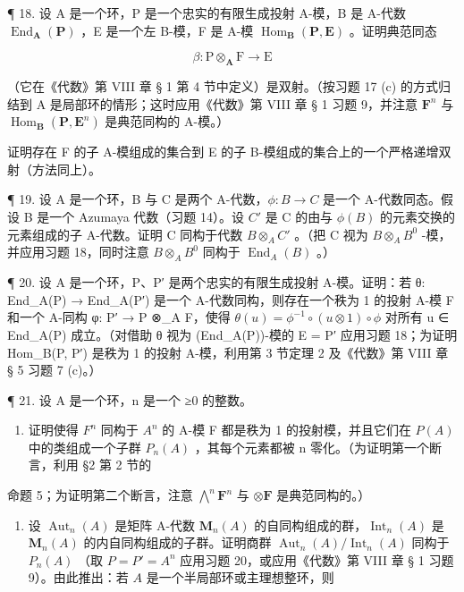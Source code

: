 ¶ 18. 设 A 是一个环，P 是一个忠实的有限生成投射 A-模，B 是 A-代数 \(\operatorname{End}_{\mathbf{A}}(\mathbf{P})\) ，E 是一个左 B-模，F 是 A-模 \(\operatorname{Hom}_{\mathbf{B}}(\mathbf{P}, \mathbf{E})\) 。证明典范同态

\[
\beta \colon \mathrm{P} \otimes_ {\mathbf {A}} \mathrm{F} \rightarrow \mathrm{E}
\]

（它在《代数》第 VIII 章 § 1 第 4 节中定义）是双射。（按习题 17 (c) 的方式归结到 A 是局部环的情形；这时应用《代数》第 VIII 章 § 1 习题 9，并注意 \(\mathbf{F}^n\) 与 \(\operatorname{Hom}_{\mathbf{B}}(\mathbf{P}, \mathbf{E}^n)\) 是典范同构的 A-模。）

证明存在 F 的子 A-模组成的集合到 E 的子 B-模组成的集合上的一个严格递增双射（方法同上）。

¶ 19. 设 A 是一个环，B 与 C 是两个 A-代数，\(\phi: B \to C\) 是一个 A-代数同态。假设 B 是一个 Azumaya 代数（习题 14）。设 \(C'\) 是 C 的由与 \(\phi(B)\) 的元素交换的元素组成的子 A-代数。证明 C 同构于代数 \(B \otimes_A C'\) 。（把 C 视为 \(B \otimes_A B^0\) -模，并应用习题 18，同时注意 \(B \otimes_A B^0\) 同构于 \(\operatorname{End}_A(B)\) 。）

¶ 20. 设 A 是一个环，P、P′ 是两个忠实的有限生成投射 A-模。证明：若 θ: End\_A(P) → End\_A(P′) 是一个 A-代数同构，则存在一个秩为 1 的投射 A-模 F 和一个 A-同构 φ: P′ → P ⊗\_A F，使得 \(\theta(u) = \phi^{-1} \circ (u \otimes 1) \circ \phi\) 对所有 u ∈ End\_A(P) 成立。（对借助 θ 视为 (End\_A(P))-模的 E = P′ 应用习题 18；为证明 Hom\_B(P, P′) 是秩为 1 的投射 A-模，利用第 3 节定理 2 及《代数》第 VIII 章 § 5 习题 7 (c)。）

¶ 21. 设 A 是一个环，n 是一个 ≥0 的整数。

\begin{enumerate}
\def\labelenumi{(\alph{enumi})}
\tightlist
\item
  证明使得 \(F^{n}\) 同构于 \(A^{n}\) 的 A-模 F 都是秩为 1 的投射模，并且它们在 \(P(A)\) 中的类组成一个子群 \(P_{n}(A)\) ，其每个元素都被 n 零化。（为证明第一个断言，利用 §2 第 2 节的
\end{enumerate}

命题 5；为证明第二个断言，注意 \(\bigwedge^{n} \mathbf{F}^{n}\) 与 \(\otimes \mathbf{F}\) 是典范同构的。）

\begin{enumerate}
\def\labelenumi{(\alph{enumi})}
\setcounter{enumi}{1}
\tightlist
\item
  设 \(\operatorname{Aut}_n(A)\) 是矩阵 A-代数 \(\mathbf{M}_n(A)\) 的自同构组成的群，\(\operatorname{Int}_n(A)\) 是 \(\mathbf{M}_n(A)\) 的内自同构组成的子群。证明商群 \(\operatorname{Aut}_n(A)/\operatorname{Int}_n(A)\) 同构于 \(P_n(A)\) （取 \(P = P' = A^n\) 应用习题 20，或应用《代数》第 VIII 章 § 1 习题 9）。由此推出：若 \(A\) 是一个半局部环或主理想整环，则
\end{enumerate}

